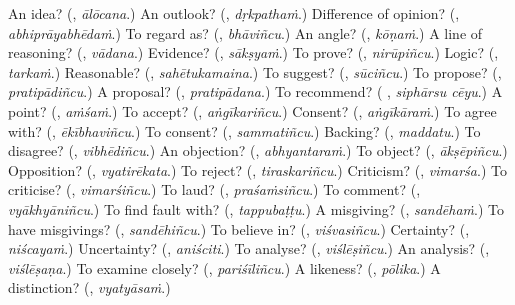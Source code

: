 \begin{tcolorbox}[breakable,colback=teal!4,colframe=teal!35!black,title={Before you move on}]
An idea? (\textbf{}, \emph{ālōcana}.) An outlook? (\textbf{}, \emph{dṛkpathaṁ}.) Difference of opinion? (\textbf{}, \emph{abhiprāyabhēdaṁ}.) To regard as? (\textbf{}, \emph{bhāviñcu}.) An angle? (\textbf{}, \emph{kōṇaṁ}.) A line of reasoning? (\textbf{}, \emph{vādana}.) Evidence? (\textbf{}, \emph{sākṣyaṁ}.) To prove? (\textbf{}, \emph{nirūpiñcu}.) Logic? (\textbf{}, \emph{tarkaṁ}.) Reasonable? (\textbf{}, \emph{sahētukamaina}.) To suggest? (\textbf{}, \emph{sūciñcu}.) To propose? (\textbf{}, \emph{pratipādiñcu}.) A proposal? (\textbf{}, \emph{pratipādana}.) To recommend? (\textbf{ }, \emph{siphārsu cēyu}.) A point? (\textbf{}, \emph{aṁśaṁ}.) To accept? (\textbf{}, \emph{aṅgīkariñcu}.) Consent? (\textbf{}, \emph{aṅgīkāraṁ}.) To agree with? (\textbf{}, \emph{ēkībhaviñcu}.) To consent? (\textbf{}, \emph{sammatiñcu}.) Backing? (\textbf{}, \emph{maddatu}.) To disagree? (\textbf{}, \emph{vibhēdiñcu}.) An objection? (\textbf{}, \emph{abhyantaraṁ}.) To object? (\textbf{}, \emph{ākṣēpiñcu}.) Opposition? (\textbf{}, \emph{vyatirēkata}.) To reject? (\textbf{}, \emph{tiraskariñcu}.) Criticism? (\textbf{}, \emph{vimarśa}.) To criticise? (\textbf{}, \emph{vimarśiñcu}.) To laud? (\textbf{}, \emph{praśaṁsiñcu}.) To comment? (\textbf{}, \emph{vyākhyāniñcu}.) To find fault with? (\textbf{}, \emph{tappubaṭṭu}.) A misgiving? (\textbf{}, \emph{sandēhaṁ}.) To have misgivings? (\textbf{}, \emph{sandēhiñcu}.) To believe in? (\textbf{}, \emph{viśvasiñcu}.) Certainty? (\textbf{}, \emph{niścayaṁ}.) Uncertainty? (\textbf{}, \emph{aniściti}.) To analyse? (\textbf{}, \emph{viślēṣiñcu}.) An analysis? (\textbf{}, \emph{viślēṣaṇa}.) To examine closely? (\textbf{}, \emph{pariśīliñcu}.) A likeness? (\textbf{}, \emph{pōlika}.) A distinction? (\textbf{}, \emph{vyatyāsaṁ}.)
\end{tcolorbox}
